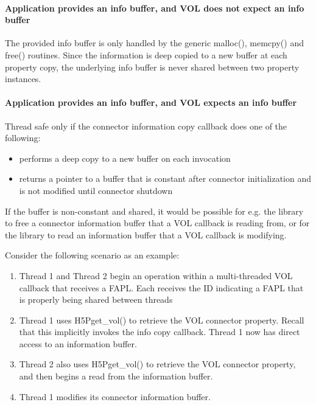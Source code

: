 \documentclass{article}
\begin{document}
\paragraph{Application provides an info buffer, and VOL does not expect an info buffer}

The provided info buffer is only handled by the generic malloc(), memcpy() and free() routines. Since the information is deep copied to a new buffer at each property copy, the underlying info buffer is never shared between two property instances.

\paragraph{Application provides an info buffer, and VOL expects an info buffer}

Thread safe only if the connector information copy callback does one of the following:

\begin{itemize}
    \item performs a deep copy to a new buffer on each invocation
    \item returns a pointer to a buffer that is constant after connector initialization and is not modified until connector shutdown
\end{itemize}

If the buffer is non-constant and shared, it would be possible for e.g. the library to free a connector information buffer that a VOL callback is reading from, or for the library to read an information buffer that a VOL callback is modifying.

Consider the following scenario as an example:

\begin{enumerate}
    \item Thread 1 and Thread 2 begin an operation within a multi-threaded VOL callback that receives a FAPL. Each receives the ID indicating a FAPL that is properly being shared between threads

    \item Thread 1 uses H5Pget\_vol() to retrieve the VOL connector property. Recall that this implicitly invokes the info copy callback. Thread 1 now has direct access to an information buffer. 

    \item Thread 2 also uses H5Pget\_vol() to retrieve the VOL connector property, and then begins a read from the information buffer.

    \item Thread 1 modifies its connector information buffer. 
\end{enumerate}
\end{document}
